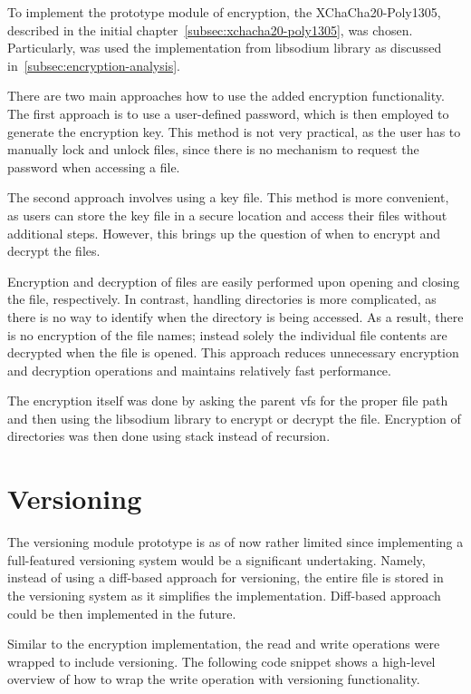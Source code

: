 To implement the prototype module of encryption, the XChaCha20-Poly1305, described in the initial chapter~\ref{subsec:xchacha20-poly1305}, was chosen.
Particularly, was used the implementation from libsodium library as discussed in~\ref{subsec:encryption-analysis}.

There are two main approaches how to use the added encryption functionality.
The first approach is to use a user-defined password, which is then employed to generate the encryption key.
This method is not very practical, as the user has to manually lock and unlock files, since there is no mechanism to request the password when accessing a file.

The second approach involves using a key file.
This method is more convenient, as users can store the key file in a secure location and access their files without additional steps.
However, this brings up the question of when to encrypt and decrypt the files.

Encryption and decryption of files are easily performed upon opening and closing the file, respectively.
In contrast, handling directories is more complicated, as there is no way to identify when the directory is being accessed.
As a result, there is no encryption of the file names; instead solely the individual file contents are decrypted when the file is opened.
This approach reduces unnecessary encryption and decryption operations and maintains relatively fast performance.

The encryption itself was done by asking the parent vfs for the proper file path and then using the libsodium library to encrypt or decrypt the file.
Encryption of directories was then done using stack instead of recursion.


\section{Versioning}\label{sec:versioning2}

The versioning module prototype is as of now rather limited since implementing a full-featured versioning system would be a significant undertaking.
Namely, instead of using a diff-based approach for versioning, the entire file is stored in the versioning system as it simplifies the implementation.
Diff-based approach could be then implemented in the future.

Similar to the encryption implementation, the read and write operations were wrapped to include versioning.
The following code snippet shows a high-level overview of how to wrap the write operation with versioning functionality.

